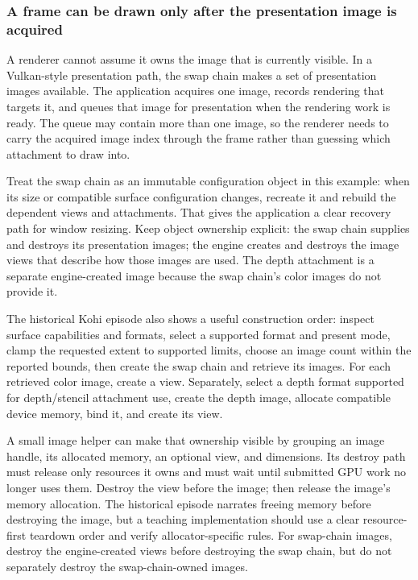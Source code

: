 \subsubsection{A frame can be drawn only after the presentation image is acquired}\label{06-engine-ii-ch026-a-frame-can-be-drawn-only-after-the-presentation-image-is-acquired}

\hypertarget{06-engine-ii-ch026-a-frame-can-be-drawn-only-after-the-presentation-image-is-acquired}{}

A renderer cannot assume it owns the image that is currently visible. In a Vulkan-style presentation path, the swap chain makes a set of presentation images available. The application acquires one image, records rendering that targets it, and queues that image for presentation when the rendering work is ready. The queue may contain more than one image, so the renderer needs to carry the acquired image index through the frame rather than guessing which attachment to draw into.

Treat the swap chain as an immutable configuration object in this example: when its size or compatible surface configuration changes, recreate it and rebuild the dependent views and attachments. That gives the application a clear recovery path for window resizing. Keep object ownership explicit: the swap chain supplies and destroys its presentation images; the engine creates and destroys the image views that describe how those images are used. The depth attachment is a separate engine-created image because the swap chain's color images do not provide it.

The historical Kohi episode also shows a useful construction order: inspect surface capabilities and formats, select a supported format and present mode, clamp the requested extent to supported limits, choose an image count within the reported bounds, then create the swap chain and retrieve its images. For each retrieved color image, create a view. Separately, select a depth format supported for depth/stencil attachment use, create the depth image, allocate compatible device memory, bind it, and create its view.

A small image helper can make that ownership visible by grouping an image handle, its allocated memory, an optional view, and dimensions. Its destroy path must release only resources it owns and must wait until submitted GPU work no longer uses them. Destroy the view before the image; then release the image's memory allocation. The historical episode narrates freeing memory before destroying the image, but a teaching implementation should use a clear resource-first teardown order and verify allocator-specific rules. For swap-chain images, destroy the engine-created views before destroying the swap chain, but do not separately destroy the swap-chain-owned images.

